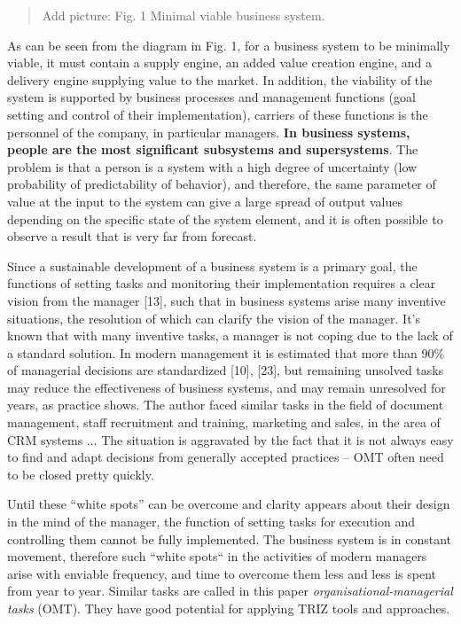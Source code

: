 \documentclass[11pt,a4paper]{book}
\newcommand{\addpicture}[1]{
  \begin{quote} Add picture: #1\end{quote}
}
\begin{document}
\addpicture{Fig. 1 Minimal viable business system.}

As can be seen from the diagram in Fig. 1, for a business system to be
minimally viable, it must contain a supply engine, an added value creation
engine, and a delivery engine supplying value to the market. In addition, the
viability of the system is supported by business processes and management
functions (goal setting and control of their implementation), carriers of
these functions is the personnel of the company, in particular managers.
\textbf{In business systems, people are the most significant subsystems and
  supersystems}. The problem is that a person is a system with a high degree
of uncertainty (low probability of predictability of behavior), and therefore,
the same parameter of value at the input to the system can give a large spread
of output values depending on the specific state of the system element, and it
is often possible to observe a result that is very far from forecast.

Since a sustainable development of a business system is a primary goal, the
functions of setting tasks and monitoring their implementation requires a
clear vision from the manager [13], such that in business systems arise many
inventive situations, the resolution of which can clarify the vision of the
manager. It’s known that with many inventive tasks, a manager is not coping
due to the lack of a standard solution. In modern management it is estimated
that more than 90\% of managerial decisions are standardized [10], [23], but
remaining unsolved tasks may reduce the effectiveness of business systems, and
may remain unresolved for years, as practice shows. The author faced similar
tasks in the field of document management, staff recruitment and training,
marketing and sales, in the area of CRM systems ... The situation is
aggravated by the fact that it is not always easy to find and adapt decisions
from generally accepted practices -- OMT often need to be closed pretty
quickly.

Until these “white spots” can be overcome and clarity appears about their
design in the mind of the manager, the function of setting tasks for execution
and controlling them cannot be fully implemented. The business system is in
constant movement, therefore such “white spots“ in the activities of modern
managers arise with enviable frequency, and time to overcome them less and
less is spent from year to year. Similar tasks are called in this paper
\emph{organisational-managerial tasks} (OMT). They have good potential for
applying TRIZ tools and approaches.
\end{document}

